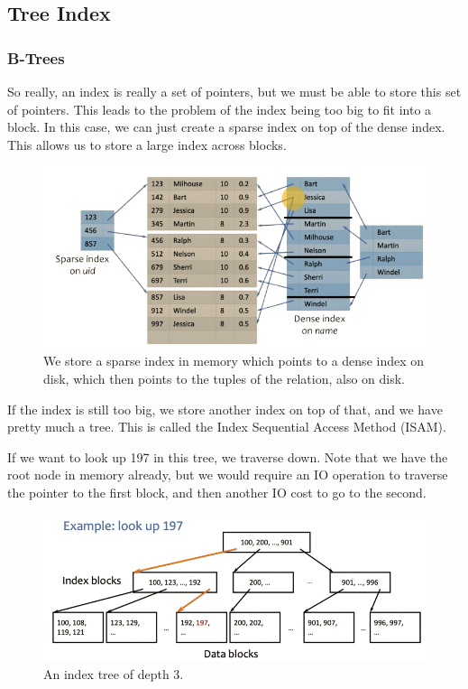 \documentclass{article}
\begin{document}
  \subsection{Tree Index} 

    \subsubsection{B-Trees}

      So really, an index is really a set of pointers, but we must be able to store this set of pointers. This leads to the problem of the index being too big to fit into a block. In this case, we can just create a sparse index on top of the dense index. This allows us to store a large index across blocks. 
      
      \begin{figure}[H]
        \centering 
        \includegraphics[scale=0.4]{img/too_big.png}
        \caption{We store a sparse index in memory which points to a dense index on disk, which then points to the tuples of the relation, also on disk. } 
        \label{fig:too_big}
      \end{figure}

      If the index is still too big, we store another index on top of that, and we have pretty much a tree. This is called the Index Sequential Access Method (ISAM). 
      
      \begin{example}
        If we want to look up 197 in this tree, we traverse down. Note that we have the root node in memory already, but we would require an IO operation to traverse the pointer to the first block, and then another IO cost to go to the second. 
        \begin{figure}[H]
          \centering 
          \includegraphics[scale=0.4]{img/isam_lookup.png}
          \caption{An index tree of depth 3.} 
          \label{fig:isam_lookup}
        \end{figure}
      \end{example}
\end{document}
